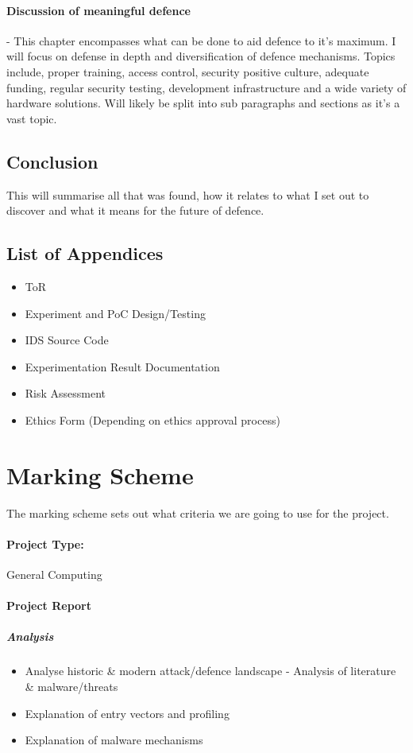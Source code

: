 \paragraph{Discussion of meaningful defence} - This chapter encompasses what can be done to aid defence to it's maximum. I will focus on defense in depth and diversification of defence mechanisms. 
Topics include, proper training, access control, security positive culture, adequate funding, regular security testing, development infrastructure and a wide variety of hardware solutions. 
Will likely be split into sub paragraphs and sections as it's a vast topic.

\subsection{Conclusion} This will summarise all that was found, how it relates to what I set out to discover and what it means for the future of defence. 

\subsection{List of Appendices}
\begin{itemize}
	\item ToR
	\item Experiment and PoC Design/Testing
	\item IDS Source Code
	\item Experimentation Result Documentation
	\item Risk Assessment
	\item Ethics Form (Depending on ethics approval process)
\end{itemize}

\section{Marking Scheme}
The marking scheme sets out what criteria we are going to use for the project.

\paragraph{Project Type:} General Computing

\paragraph{Project Report}
\subparagraph{Analysis}
\begin{itemize}
	\item Analyse historic \& modern attack/defence landscape - Analysis of
		literature \& malware/threats 
	\item Explanation of entry vectors and profiling
	\item Explanation of malware mechanisms
\end{itemize}

